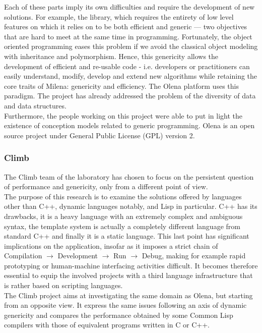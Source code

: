 Each of these parts imply its own difficulties and require the development of new solutions.
For example, the library, which requires the entirety of low level features on which it relies on to be
both efficient and generic --- two objectives that are hard to meet at the same time in programming.
Fortunately, the object oriented programming eases this problem if we avoid the classical object
modeling with inheritance and polymorphism. Hence, this genericity allows the development of efficient
and re-usable code - i.e. developers or practitioners can easily understand, modify, develop and extend
new algorithms while retaining the core traits of Milena: genericity and efficiency.
The Olena platform uses this paradigm. The project has already addressed the problem of the diversity of data
and data structures.\\

Furthermore, the people working on this project were able to put in light the existence of conception
models related to generic programming. Olena is an open source project under General Public License (GPL)
version 2.


\subsubsection{Climb}
The Climb team of the laboratory has chosen to focus on the persistent question of performance and
genericity, only from a different point of view.\\

The purpose of this research is to examine the solutions offered by languages other than C++, dynamic
languages notably, and Lisp in particular. C++ has its drawbacks, it is a heavy language with an extremely
complex and ambiguous syntax, the template system is actually a completely different language from standard
C++ and finally it is a static language. This last point has significant implications on the application,
insofar as it imposes a strict chain of Compilation $\rightarrow$ Development $\rightarrow$ Run
$\rightarrow$ Debug, making for example rapid prototyping or human-machine interfacing activities difficult.
It becomes therefore essential to equip the involved projects with a third language infrastructure that is
rather based on scripting languages.\\

The Climb project aims at investigating the same domain as Olena, but starting from an opposite view.
It express the same issues following an axis of dynamic genericity and compares the performance obtained by
some Common Lisp compilers with those of equivalent programs written in C or C++.

